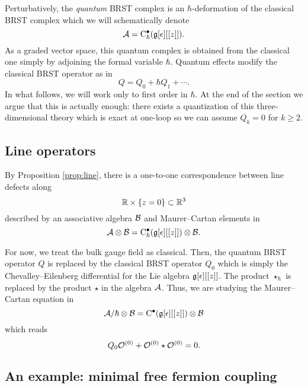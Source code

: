 \documentclass[11pt]{amsart}
\begin{document}
Perturbatively, the {\em quantum} BRST complex is an $\hbar$-deformation of the classical BRST complex which we will schematically denote
\[
\mathcal A = {\rm C}^\bullet_\hbar (\mathfrak g[\epsilon][[z]])  .
\]
As a graded vector space, this quantum complex is obtained from the classical one simply by adjoining the formal variable $\hbar$. 
Quantum effects modify the classical BRST operator as in
\[
Q = Q_0 + \hbar Q_1 + \cdots .
\]
In what follows, we will work only to first order in $\hbar$.
At the end of the section we argue that this is actually enough: there exists a quantization of this three-dimensional theory which is exact at one-loop so we can assume $Q_k = 0$ for $k \geq 2$. 

\subsection{Line operators}

By Proposition \ref{prop:line}, there is a one-to-one correspondence between line defects along
\[
\mathbb R \times \{z=0\} \subset \mathbb R^3 
\]
described by an associative algebra $\mathcal B$ and Maurer--Cartan elements in 
\begin{equation}\label{eqn:criticalobs}
\mathcal A \otimes \mathcal B = {\rm C}_\hbar^\bullet(\mathfrak g[\epsilon][[z]]) \otimes \mathcal B .
\end{equation}


For now, we treat the bulk gauge field as classical.
Then, the quantum BRST operator $Q$ is replaced by the classical BRST operator $Q_0$ which is simply the Chevalley--Eilenberg differential for the Lie algebra $\mathfrak g[\epsilon][[z]]$.
The product $\star_\hbar$ is replaced by the product $\star$ in the algebra $\mathcal A$. 
Thus, we are studying the Maurer--Cartan equation in
\[
\mathcal A / \hbar \otimes \mathcal B = {\rm C}^\bullet(\mathfrak g[\epsilon][[z]]) \otimes \mathcal B
\]
which reads
\begin{equation}\label{eqn:cmccs}
Q_0 \mathcal O^{(0)} + \mathcal O^{(0)} \star \mathcal O^{(0)} = 0 .
\end{equation}

\subsection{An example: minimal free fermion coupling}
\end{document}
